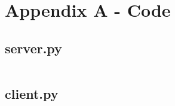 \section{Appendix A - Code}
\subsection{server.py}
\inputminted[fontfamily=Latin Modern Mono,obeytabs=true,tabsize=2,fontsize=\footnotesize, frame=lines,linenos=true,breaklines]{python}{../Week 3/server.py}
\pagebreak
\subsection{client.py}
\inputminted[fontfamily=Latin Modern Mono,obeytabs=true,tabsize=2,fontsize=\footnotesize,frame=lines,linenos=true,breaklines, breakafter=/]{python}{../Week 3/client.py}

